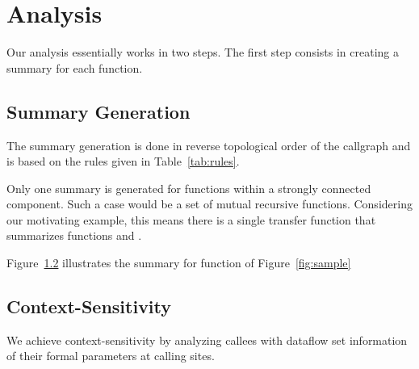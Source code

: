 \section{Analysis}\label{analysis}

Our analysis essentially works in two steps. The
first step consists in creating a summary for each
function.

\subsection{Summary Generation}

The summary
generation is done in reverse topological order of
the callgraph and is based on the rules given in
Table~\ref{tab:rules}.

Only one summary is generated for functions within
a strongly connected component. Such a case would be
a set of mutual recursive functions. Considering our
motivating example, this means there is a single transfer
function that summarizes functions \even{} and \odd{}.

Figure~\ref{} illustrates the summary for function
\main{} of Figure~\ref{fig:sample}

\subsection{Context-Sensitivity} 

We achieve context-sensitivity by analyzing callees
with dataflow set information of their formal parameters
at calling sites.
